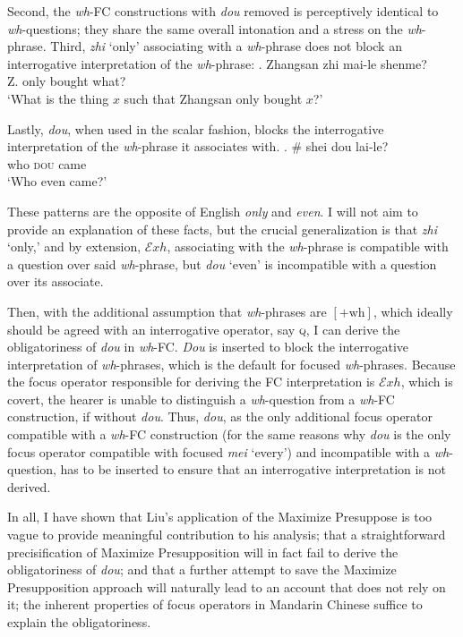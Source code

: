\documentclass[12pt]{article}
\newcommand{\Exh}{\ensuremath{\mathcal{E}\mathit{xh}}}
\begin{document}
Second, the \emph{wh}-FC constructions with \emph{dou} removed is perceptively identical to \emph{wh}-questions; they share the same overall intonation and a stress on the \emph{wh}-phrase.
Third, \emph{zhi} `only' associating with a \emph{wh}-phrase does not block an interrogative interpretation of the \emph{wh}-phrase: 
\ex. \gll 
Zhangsan zhi mai-le shenme? \\
Z. only bought what? \\
\glt `What is the thing \(x\) such that Zhangsan only bought \(x\)?'

Lastly, \emph{dou}, when used in the scalar fashion, blocks the interrogative interpretation of the \emph{wh}-phrase it associates with.
\ex. \# \gll 
shei dou lai-le? \\
who \textsc{dou} came \\
\glt `Who even came?'

These patterns are the opposite of English \emph{only} and \emph{even}.
I will not aim to provide an explanation of these facts, but the crucial generalization is that \emph{zhi} `only,' and by extension, {\Exh}, associating with the \emph{wh}-phrase is compatible with a question over said \emph{wh}-phrase, but \emph{dou} `even' is incompatible with a question over its associate.

Then, with the additional assumption that \emph{wh}-phrases are \([+\mathrm{wh}]\), which ideally should be agreed with an interrogative operator, say \textsc{q}, I can derive the obligatoriness of \emph{dou} in \emph{wh}-FC.
\emph{Dou} is inserted to block the interrogative interpretation of \emph{wh}-phrases, which is the default for focused \emph{wh}-phrases.
Because the focus operator responsible for deriving the FC interpretation is {\Exh}, which is covert, the hearer is unable to distinguish a \emph{wh}-question from a \emph{wh}-FC construction, if without \emph{dou}.
Thus, \emph{dou}, as the only additional focus operator compatible with a \emph{wh}-FC construction (for the same reasons why \emph{dou} is the only focus operator compatible with focused \emph{mei} `every') and incompatible with a \emph{wh}-question, has to be inserted to ensure that an interrogative interpretation is not derived.

In all, I have shown that Liu's application of the Maximize Presuppose is too vague to provide meaningful contribution to his analysis; that a straightforward precisification of Maximize Presupposition will in fact fail to derive the obligatoriness of \emph{dou}; and that a further attempt to save the Maximize Presupposition approach will naturally lead to an account that does not rely on it; the inherent properties of focus operators in Mandarin Chinese suffice to explain the obligatoriness.
\end{document}
